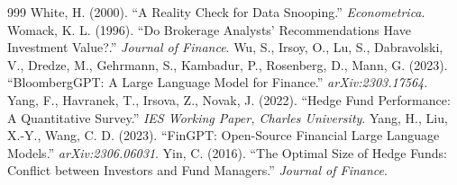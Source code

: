 \begin{thebibliography}{999}
 White, H. (2000). ``A Reality Check for Data Snooping.'' \textit{Econometrica}.
 Womack, K. L. (1996). ``Do Brokerage Analysts' Recommendations Have Investment Value?.'' \textit{Journal of Finance}.
 Wu, S., Irsoy, O., Lu, S., Dabravolski, V., Dredze, M., Gehrmann, S., Kambadur, P., Rosenberg, D., Mann, G. (2023). ``BloombergGPT: A Large Language Model for Finance.'' \textit{arXiv:2303.17564}.
 Yang, F., Havranek, T., Irsova, Z., Novak, J. (2022). ``Hedge Fund Performance: A Quantitative Survey.'' \textit{IES Working Paper, Charles University}.
 Yang, H., Liu, X.-Y., Wang, C. D. (2023). ``FinGPT: Open-Source Financial Large Language Models.'' \textit{arXiv:2306.06031}.
 Yin, C. (2016). ``The Optimal Size of Hedge Funds: Conflict between Investors and Fund Managers.'' \textit{Journal of Finance}.
\end{thebibliography}
